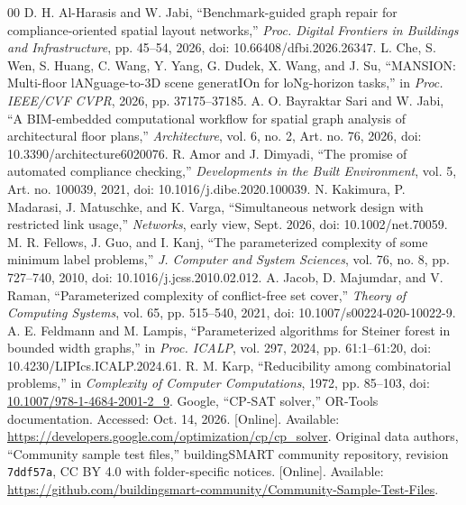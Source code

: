\documentclass[conference]{IEEEtran}
\begin{document}
\begin{thebibliography}{00}
 D. H. Al-Harasis and W. Jabi, ``Benchmark-guided graph repair for compliance-oriented spatial layout networks,'' \emph{Proc. Digital Frontiers in Buildings and Infrastructure}, pp. 45--54, 2026, doi: 10.66408/dfbi.2026.26347.
 L. Che, S. Wen, S. Huang, C. Wang, Y. Yang, G. Dudek, X. Wang, and J. Su, ``MANSION: Multi-floor lANguage-to-3D scene generatIOn for loNg-horizon tasks,'' in \emph{Proc. IEEE/CVF CVPR}, 2026, pp. 37175--37185.
 A. O. Bayraktar Sari and W. Jabi, ``A BIM-embedded computational workflow for spatial graph analysis of architectural floor plans,'' \emph{Architecture}, vol. 6, no. 2, Art. no. 76, 2026, doi: 10.3390/architecture6020076.
 R. Amor and J. Dimyadi, ``The promise of automated compliance checking,'' \emph{Developments in the Built Environment}, vol. 5, Art. no. 100039, 2021, doi: 10.1016/j.dibe.2020.100039.
 N. Kakimura, P. Madarasi, J. Matuschke, and K. Varga, ``Simultaneous network design with restricted link usage,'' \emph{Networks}, early view, Sept. 2026, doi: 10.1002/net.70059.
 M. R. Fellows, J. Guo, and I. Kanj, ``The parameterized complexity of some minimum label problems,'' \emph{J. Computer and System Sciences}, vol. 76, no. 8, pp. 727--740, 2010, doi: 10.1016/j.jcss.2010.02.012.
 A. Jacob, D. Majumdar, and V. Raman, ``Parameterized complexity of conflict-free set cover,'' \emph{Theory of Computing Systems}, vol. 65, pp. 515--540, 2021, doi: 10.1007/s00224-020-10022-9.
 A. E. Feldmann and M. Lampis, ``Parameterized algorithms for Steiner forest in bounded width graphs,'' in \emph{Proc. ICALP}, vol. 297, 2024, pp. 61:1--61:20, doi: 10.4230/LIPIcs.ICALP.2024.61.
 R. M. Karp, ``Reducibility among combinatorial problems,'' in \emph{Complexity of Computer Computations}, 1972, pp. 85--103, doi: \url{10.1007/978-1-4684-2001-2_9}.
 Google, ``CP-SAT solver,'' OR-Tools documentation. Accessed: Oct. 14, 2026. [Online]. Available: \url{https://developers.google.com/optimization/cp/cp_solver}.
 Original data authors, ``Community sample test files,'' buildingSMART community repository, revision \texttt{7ddf57a}, CC BY 4.0 with folder-specific notices. [Online]. Available: \url{https://github.com/buildingsmart-community/Community-Sample-Test-Files}.
\end{thebibliography}
\end{document}
